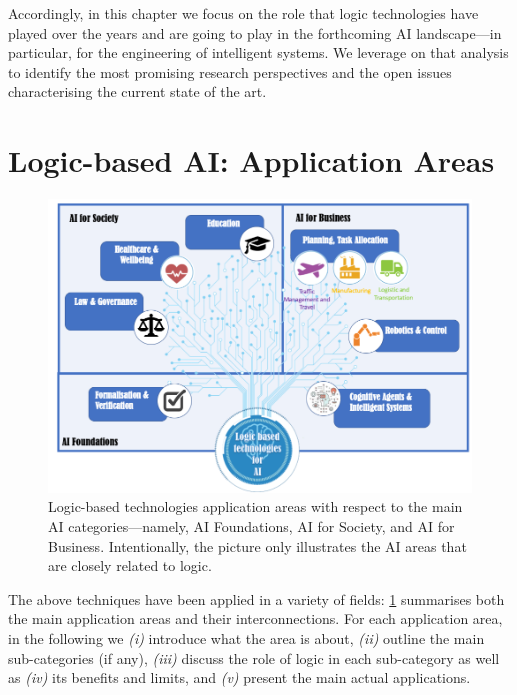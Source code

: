 \documentclass[12pt,a4paper,openright,twoside]{book}
\begin{document}
Accordingly, in this chapter we focus on the role that logic technologies have played over the years and are going to play in the forthcoming AI landscape---in particular, for the engineering of intelligent systems.
%
We leverage on that analysis to identify the most promising research perspectives and the open issues characterising the current state of the art.

\section{Logic-based AI: Application Areas}\label{sec:application}

\begin{figure}
    \centering\includegraphics[width=\linewidth]{figures/logicForAI.png}
    \caption{Logic-based technologies application areas with respect to the main AI categories---namely, AI Foundations, AI for Society, and AI for Business.  Intentionally, the picture only illustrates the AI areas that are closely related to logic.}
    \label{fig:logicBasedAIArea}
\end{figure}

The above techniques have been applied in a variety of fields: \cref{fig:logicBasedAIArea} summarises both the main application areas and their interconnections.
%
For each application area, in the following we \emph{(i)} introduce what the area is about, \emph{(ii)} outline the main sub-categories (if any), \emph{(iii)} discuss the role of logic in each sub-category as well as \emph{(iv)} its benefits and limits, and \emph{(v)} present the main actual applications.
\end{document}

